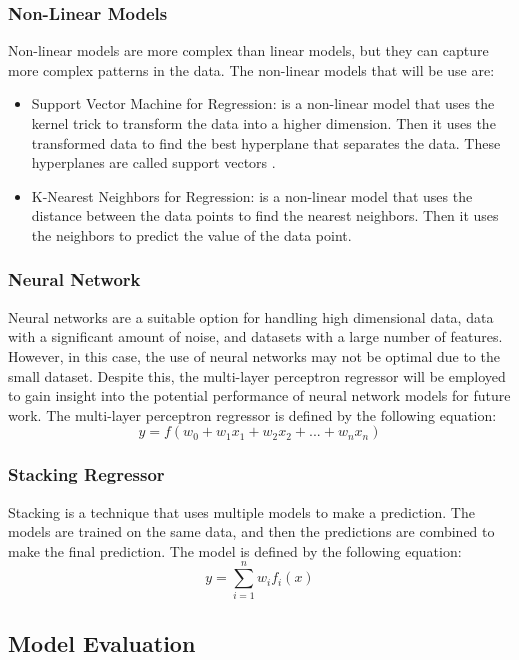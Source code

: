 \documentclass{report}
\begin{document}
\subsubsection{Non-Linear Models}
Non-linear models are more complex than linear models, but they can capture more complex patterns in the data. The non-linear models that will be use are:
\begin{itemize}
    \item Support Vector Machine for Regression: is a non-linear model that uses the kernel trick to transform the data into a higher dimension. Then it uses the transformed data to find the best hyperplane that separates the data. These hyperplanes are called support vectors\cite{scikit-learn} . 
    \item K-Nearest Neighbors for Regression: is a non-linear model that uses the distance between the data points to find the nearest neighbors. Then it uses the neighbors to predict the value of the data point\cite{scikit-learn}. 
\end{itemize}
\subsubsection{Neural Network}
Neural networks are a suitable option for handling high dimensional data, data with a significant amount of noise, and datasets with a large number of features. However, in this case, the use of neural networks may not be optimal due to the small dataset. Despite this, the multi-layer perceptron regressor will be employed to gain insight into the potential performance of neural network models for future work. The multi-layer perceptron regressor is defined by the following equation:
\begin{equation}
    y = f(w_0 + w_1x_1 + w_2x_2 + ... + w_nx_n)
\end{equation}
\subsubsection{Stacking Regressor}
Stacking is a technique that uses multiple models to make a prediction. The models are trained on the same data, and then the predictions are combined to make the final prediction. The model is defined by the following equation:
\begin{equation}
    y = \sum_{i=1}^{n} w_i f_i(x)
\end{equation}
\subsection{Model Evaluation}
\end{document}
